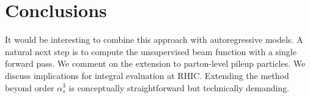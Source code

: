 \section{Conclusions}\label{sec:conclusions}

It would be interesting to combine this approach with autoregressive
models. A natural next step is to compute the unsupervised beam function
with a single forward pass. We comment on the extension to parton-level
pileup particles. We discuss implications for integral evaluation at
RHIC. Extending the method beyond order $\alpha_s^3$ is conceptually
straightforward but technically demanding.

